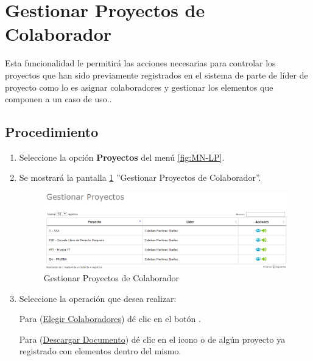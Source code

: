 \hypertarget{cv:GestionarProyectosColaboradores}{\section{Gestionar Proyectos de Colaborador}} \label{sec:GestionarProyectosColaboradores}

	Esta funcionalidad le permitirá las acciones necesarias para controlar los proyectos que han sido previamente registrados en el sistema de parte de líder de proyecto como lo es asignar colaboradores y gestionar los elementos que componen a un caso de uso..

		\subsection{Procedimiento}

			\begin{enumerate}
	
			\item Seleccione la opción \textbf{Proyectos} del menú \ref{fig:MN-LP}.
	
			\item Se mostrará la pantalla \ref{fig:GestionarProyectosColaborador} ''Gestionar Proyectos de Colaborador''.

			\begin{figure}[htbp!]
				\begin{center}
					\includegraphics[scale=0.6]{roles/lider/proyectosColaborador/pantallas/IU4gestionarProyectosColaborador}
					\caption{Gestionar Proyectos de Colaborador}
					\label{fig:GestionarProyectosColaborador}
				\end{center}
			\end{figure}
		
				\item Seleccione la operación que desea realizar:
			
			Para (\hyperlink{cv:elegirColaboradores}{Elegir Colaboradores}) dé clic en el botón \IUAsignar.
			
			Para (\hyperlink{cv:DescargarDocumento}{Descargar Documento}) dé clic en el icono \IUPdf{} o \IUWord{} de algún proyecto ya registrado con elementos dentro del mismo.
			
			\end{enumerate}